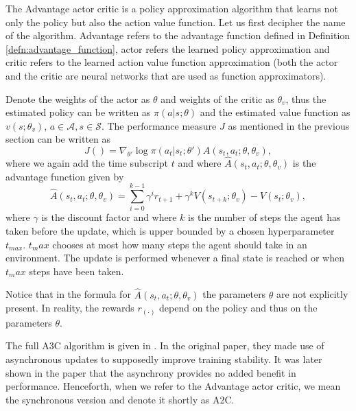 The Advantage actor critic is a policy approximation algorithm that learns not only the policy but also the action value function. Let us first decipher the name of the algorithm. Advantage refers to the advantage function defined in Definition \ref{defn:advantage_function}, actor refers the learned policy approximation and critic refers to the learned action value function approximation (both the actor and the critic are neural networks that are used as function approximators). 

Denote the weights of the actor as $\theta$ and weights of the critic as $\theta_v$, thus the estimated policy can be written as $\pi(a|s;\theta)$ and the estimated value function as $v(s;\theta_v)$, $a \in \mathcal{A}, s \in \mathcal{S}$. The performance measure $J$ as mentioned in the previous section can be written as
\begin{equation}
J() = \nabla_{\theta'} \log \pi(a_t|s_t;\theta')A(s_t,a_t;\theta,\theta_v),
\end{equation}
where we again add the time subscript $t$ and where $\widehat{A}(s_t,a_t;\theta,\theta_v)$ is the advantage function given by 
\begin{equation}
\widehat{A}(s_t,a_t;\theta,\theta_v)=\sum_{i=0}^{k-1}\gamma^i r_{t+1} + \gamma^k V(s_{t+k};\theta_v) - V(s_{t};\theta_v),
\end{equation}
where $\gamma$ is the discount factor and where $k$ is the number of steps the agent has taken before the update, which is upper bounded by a chosen hyperparameter $t_{max}$. $t_max$ chooses at most how many steps the agent should take in an environment. The update is performed whenever a final state is reached or when $t_max$ steps have been taken.
\begin{rem}
Notice that in the formula for $\widehat{A}(s_t,a_t;\theta,\theta_v)$ the parameters $\theta$ are not explicitly present. In reality, the rewards $r_{(\cdot)}$ depend on the policy and thus on the parameters $\theta$.  
\end{rem}

The full A3C algorithm is given in \cite[Algorithm S3]{a3c_paper}.  In the original paper, they made use of asynchronous updates to supposedly improve training stability. It was later shown in the paper \cite{a3c_asynchrony_not_necessary} that the asynchrony provides no added benefit in performance. Henceforth, when we refer to the Advantage actor critic, we mean the synchronous version and denote it shortly as A2C.